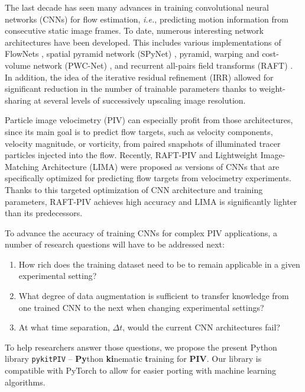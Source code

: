 \documentclass[a4paper,fleqn]{cas-dc}
\begin{document}
The last decade has seen many advances in training convolutional neural networks (CNNs) for flow estimation, \textit{i.e.}, predicting motion information from consecutive static image frames. To date, numerous interesting network architectures have been developed. This includes various implementations of FlowNets \citep{dosovitskiy2015flownet, ilg2017flownet, hui2018liteflownet}, spatial pyramid network (SPyNet) \cite{ranjan2017optical}, pyramid, warping and cost-volume network (PWC-Net) \cite{sun2018pwc}, and recurrent all-pairs field transforms (RAFT) \cite{teed2020raft}. In addition, the idea of the iterative residual refinement (IRR) \cite{hur2019iterative} allowed for significant reduction in the number of trainable parameters thanks to weight-sharing at several levels of successively upscaling image resolution.

Particle image velocimetry (PIV) can especially profit from those architectures, since its main goal is to predict flow targets, such as velocity components, velocity magnitude, or vorticity, from paired snapshots of illuminated tracer particles injected into the flow. Recently, RAFT-PIV \cite{lagemann2021deep} and Lightweight Image-Matching Architecture (LIMA) \citep{manickathan2023lightweight} were proposed as versions of CNNs that are specifically optimized for predicting flow targets from velocimetry experiments. Thanks to this targeted optimization of CNN architecture and training parameters, RAFT-PIV achieves high accuracy and LIMA is significantly lighter than its predecessors.

To advance the accuracy of training CNNs for complex PIV applications, a number of research questions will have to be addressed next:
\begin{enumerate}
\item How rich does the training dataset need to be to remain applicable in a given experimental setting?
\item What degree of data augmentation is sufficient to transfer knowledge from one trained CNN to the next when changing experimental settings?
\item At what time separation, $\Delta t$, would the current CNN architectures fail?
\end{enumerate}


To help researchers answer those questions, we propose the present Python library \texttt{pykitPIV} -- \textbf{Py}thon \textbf{ki}nematic \textbf{t}raining for \textbf{PIV}. Our library is compatible with PyTorch \cite{paszke2017automatic, paszke2019pytorch} to allow for easier porting with machine learning algorithms.
\end{document}
